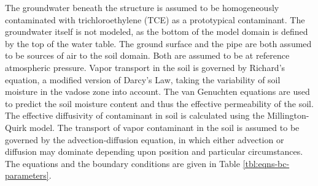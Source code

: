 \documentclass[journal=esthag,manuscript=article]{achemso}
\begin{document}
The groundwater beneath the structure is assumed to be homogeneously contaminated with trichloroethylene (TCE) as a prototypical contaminant.
The groundwater itself is not modeled, as the bottom of the model domain is defined by the top of the water table.
The ground surface and the pipe are both assumed to be sources of air to the soil domain.
Both are assumed to be at reference atmospheric pressure.
Vapor transport in the soil is governed by Richard’s equation, a modified version  of Darcy’s Law, taking the variability of soil moisture in the vadose zone into account\cite{richards_capillary_1931}.
The van Genuchten equations are used to predict the soil moisture content and thus the effective permeability of the soil\cite{van_genuchten_closed-form_1980}.
The effective diffusivity of contaminant in soil is calculated using the Millington-Quirk model\cite{millington_permeability_1961}.
The transport of vapor contaminant in the soil is assumed to be governed by the advection-diffusion equation, in which either advection or diffusion may dominate depending upon position and particular circumstances.
The equations and the boundary conditions are given in Table \ref{tbl:eqns-bc-parameters}.
\end{document}
